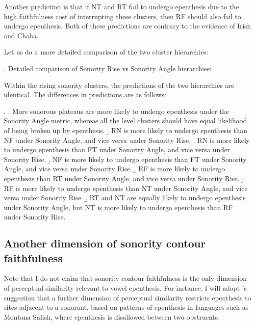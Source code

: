 \documentclass[12pt]{article}
\begin{document}
Another prediction is that if NT and RT fail to undergo epenthesis due to the high faithfulness cost of interrupting these clusters, then RF should also fail to undergo epenthesis. Both of these predictions are contrary to the evidence of Irish and Chaha.

Let us do a more detailed comparison of the two cluster hierarchies:

\ex. Detailed comparison of {\sc Sonority Rise} vs {\sc Sonority Angle} hierarchies:

\noindent \resizebox{\linewidth}{!}{\usebox{\sonorityanglehierarchycompressed}}

\vspace{-2em}
\noindent \resizebox{\linewidth}{!}{\usebox{\sonorityrisehierarchycompressed}}

Within the rising sonority clusters, the predictions of the two hierarchies are identical.
The differences in predictions are as follows:

\ex. \a. More sonorous plateaus are more likely to undergo epenthesis under the {\sc Sonority Angle} metric, whereas all the level clusters should have equal likelihood of being broken up by epenthesis.
     \b. RN is more likely to undergo epenthesis than NF under {\sc Sonority Angle}, and vice versa under {\sc Sonority Rise}.
     \b. RN is more likely to undergo epenthesis than FT under {\sc Sonority Angle}, and vice versa under {\sc Sonority Rise}.
     \b. NF is more likely to undergo epenthesis than FT under {\sc Sonority Angle}, and vice versa under {\sc Sonority Rise}.
     \b. RF is more likely to undergo epenthesis than RT under {\sc Sonority Angle}, and vice versa under {\sc Sonority Rise}.
     \b. RF is more likely to undergo epenthesis than NT under {\sc Sonority Angle}, and vice versa under {\sc Sonority Rise}.
     \b. RT and NT are equally likely to undergo epenthesis under {\sc Sonority Angle}, but NT is more likely to undergo epenthesis than RF under {\sc Sonority Rise}.

\subsection{Another dimension of sonority contour faithfulness} \label{depson}

Note that I do not claim that sonority contour faithfulness is the only dimension of perceptual similarity relevant to vowel epenthesis. For instance, I will adopt \citet{flemming.2008}'s suggestion that a further dimension of perceptual similarity restricts epenthesis to sites adjacent to a sonorant, based on patterns of epenthesis in languages such as Montana Salish, where epenthesis is disallowed between two obstruents. 
\end{document}
